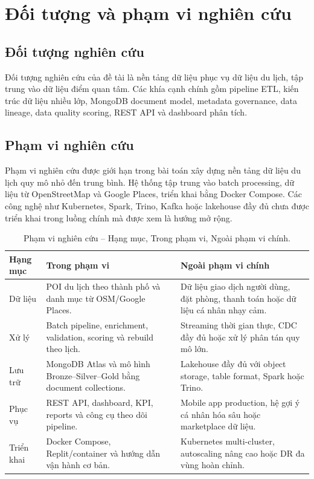 \documentclass[12pt,a4paper]{article}
\begin{document}
\section{Đối tượng và phạm vi nghiên cứu}

\subsection{Đối tượng nghiên cứu}

Đối tượng nghiên cứu của đề tài là nền tảng dữ liệu phục vụ dữ liệu du lịch, tập trung vào dữ liệu điểm quan tâm. Các khía cạnh chính gồm pipeline ETL, kiến trúc dữ liệu nhiều lớp, MongoDB document model, metadata governance, data lineage, data quality scoring, REST API và dashboard phân tích.

\subsection{Phạm vi nghiên cứu}

Phạm vi nghiên cứu được giới hạn trong bài toán xây dựng nền tảng dữ liệu du lịch quy mô nhỏ đến trung bình. Hệ thống tập trung vào batch processing, dữ liệu từ OpenStreetMap và Google Places, triển khai bằng Docker Compose. Các công nghệ như Kubernetes, Spark, Trino, Kafka hoặc lakehouse đầy đủ chưa được triển khai trong luồng chính mà được xem là hướng mở rộng.

\begin{longtable}{@{}p{}p{}p{}@{}}
\caption{Phạm vi nghiên cứu -- Hạng mục, Trong phạm vi, Ngoài phạm vi chính.}\\
\toprule
\textbf{Hạng mục} & \textbf{Trong phạm vi} & \textbf{Ngoài phạm vi chính} \\
\midrule
Dữ liệu & POI du lịch theo thành phố và danh mục từ OSM/Google Places. & Dữ liệu giao dịch người dùng, đặt phòng, thanh toán hoặc dữ liệu cá nhân nhạy cảm. \\
Xử lý & Batch pipeline, enrichment, validation, scoring và rebuild theo lịch. & Streaming thời gian thực, CDC đầy đủ hoặc xử lý phân tán quy mô lớn. \\
Lưu trữ & MongoDB Atlas và mô hình Bronze--Silver--Gold bằng document collections. & Lakehouse đầy đủ với object storage, table format, Spark hoặc Trino. \\
Phục vụ & REST API, dashboard, KPI, reports và công cụ theo dõi pipeline. & Mobile app production, hệ gợi ý cá nhân hóa sâu hoặc marketplace dữ liệu. \\
Triển khai & Docker Compose, Replit/container và hướng dẫn vận hành cơ bản. & Kubernetes multi-cluster, autoscaling nâng cao hoặc DR đa vùng hoàn chỉnh. \\
\bottomrule
\end{longtable}
\end{document}
